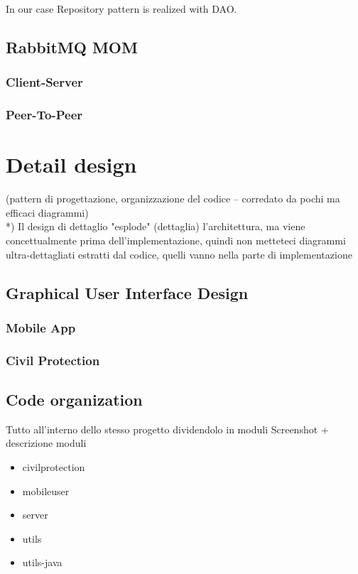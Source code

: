 \documentclass[a4paper,12pt]{report}
\begin{document}
In our case Repository pattern is realized with DAO.
\section{RabbitMQ MOM}
\subsection{Client-Server}
\subsection{Peer-To-Peer}

\chapter{Detail design}
(pattern di progettazione, organizzazione del codice -- corredato da pochi ma efficaci diagrammi)\\
*) Il design di dettaglio "esplode" (dettaglia) l'architettura, ma viene concettualmente prima dell'implementazione, quindi non metteteci diagrammi ultra-dettagliati estratti dal codice, quelli vanno nella parte di implementazione

\section{Graphical User Interface Design}
\subsection{Mobile App}
\subsection{Civil Protection}

\section{Code organization}
Tutto all'interno dello stesso progetto dividendolo in moduli
Screenshot + descrizione moduli
\begin{itemize}
\item civilprotection
\item mobileuser
\item server
\item utils
\item utils-java
\end{itemize}
\end{document}
